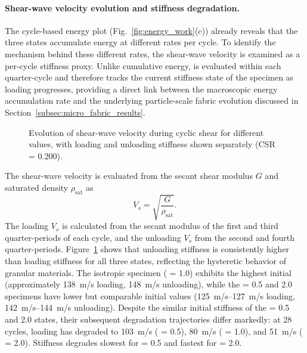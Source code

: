 \paragraph{Shear-wave velocity evolution and stiffness degradation.}
The cycle-based energy plot (Fig.~\ref{fig:energy_work}(c)) already reveals that the three \Kzero{} states accumulate energy at different rates per cycle. To identify the mechanism behind these different rates, the shear-wave velocity \Vs{} is examined as a per-cycle stiffness proxy. Unlike cumulative energy, \Vs{} is evaluated within each quarter-cycle and therefore tracks the current stiffness state of the specimen as loading progresses, providing a direct link between the macroscopic energy accumulation rate and the underlying particle-scale fabric evolution discussed in Section~\ref{subsec:micro_fabric_results}.

\begin{figure}[t]
  \centering
  \caption{Evolution of shear-wave velocity during cyclic shear for different \Kzero{} values, with loading and unloading stiffness shown separately (CSR = 0.200).}
  \label{fig:vs_evolution}
\end{figure}

The shear-wave velocity is evaluated from the secant shear modulus $G$ and saturated density $\rho_{\mathrm{sat}}$ as \citep{XuLing2015}
\begin{equation}
V_s = \sqrt{\frac{G}{\rho_{\mathrm{sat}}}}.
\label{eq:vs_definition}
\end{equation}
The loading $V_s$ is calculated from the secant modulus of the first and third quarter-periods of each cycle, and the unloading $V_s$ from the second and fourth quarter-periods. Figure~\ref{fig:vs_evolution} shows that unloading stiffness is consistently higher than loading stiffness for all three states, reflecting the hysteretic behavior of granular materials. The isotropic specimen (\Kzero{} = 1.0) exhibits the highest initial \Vs{} (approximately \SI{138}{m/s} loading, \SI{148}{m/s} unloading), while the \Kzero{} = 0.5 and 2.0 specimens have lower but comparable initial values (\SIrange{125}{127}{m/s} loading, \SIrange{142}{144}{m/s} unloading). Despite the similar initial stiffness of the \Kzero{} = 0.5 and 2.0 states, their subsequent degradation trajectories differ markedly: at 28 cycles, loading \Vs{} has degraded to \SI{103}{m/s} (\Kzero{} = 0.5), \SI{80}{m/s} (\Kzero{} = 1.0), and \SI{51}{m/s} (\Kzero{} = 2.0). Stiffness degrades slowest for \Kzero{} = 0.5 and fastest for \Kzero{} = 2.0.

